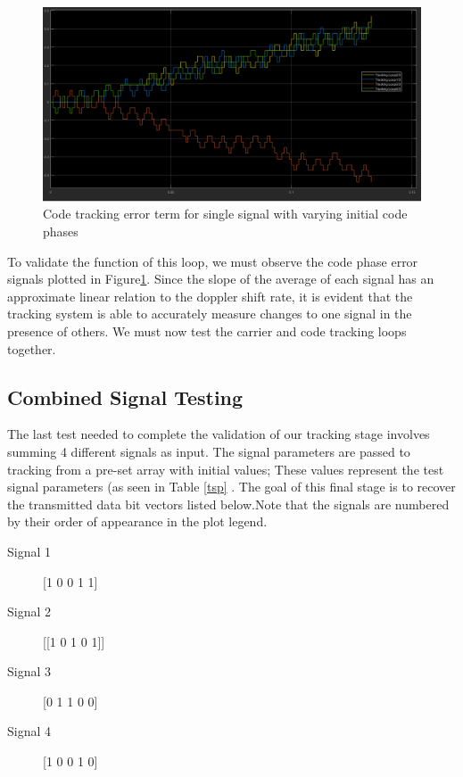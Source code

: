 \documentclass[11pt]{article}
\numberwithin{equation}{subsection}
\begin{document}
	\begin{figure}
		\centering
		\includegraphics[width=\textwidth]{Code_Tracking_Test_3}
		\caption{Code tracking error term for single signal with varying initial code phases}
		\label{code3}
	\end{figure}
	\FloatBarrier
	To validate the function of this loop, we must observe the code phase error signals plotted in Figure\ref{code3}. Since the slope of the average of each signal has an approximate linear relation to the doppler shift rate, it is evident that the tracking system is able to accurately measure changes to one signal in the presence of others. We must now test the carrier and code tracking loops together.
	
	\subsection{Combined Signal Testing}
	The last test needed to complete the validation of our tracking stage involves summing 4 different signals as input. The signal parameters are passed to tracking from a pre-set array with initial values; These values represent the test signal parameters (as seen in Table \ref{tsp} . The goal of this final stage is to recover the transmitted data bit vectors listed below.Note that the signals are numbered by their order of appearance in the plot legend. 
	\begin{description}
		\item[Signal 1]{[1 0 0 1 1]}
		
		\item[Signal 2]{[[1 0 1 0 1]]}
		
		\item[Signal 3]{[0 1 1 0 0]}
		
		\item[Signal 4]{[1 0 0 1 0]}
	\end{description}
	
\end{document}
